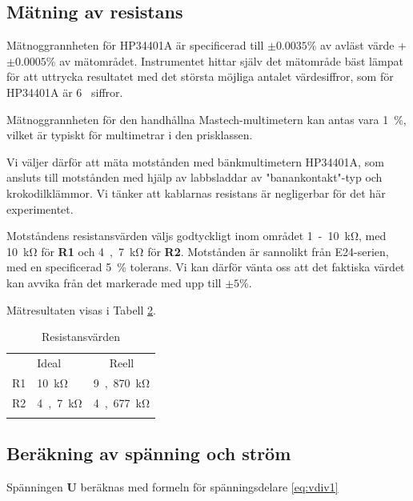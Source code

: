 \documentclass[11pt,a4paper]{article}
\begin{document}
\subsection{Mätning av resistans}\label{vdiv}
\par Mätnoggrannheten för HP34401A är specificerad till $\pm{}0.0035\%$ av
avläst värde + $\pm{}0.0005\%$ av mätområdet. Instrumentet hittar själv det
mätområde bäst lämpat för att uttrycka resultatet med det största möjliga antalet
värdesiffror, som för HP34401A är \si{6} siffror.
\par Mätnoggrannheten för den handhållna Mastech-multimetern kan antas vara
\si{1\%}, vilket är typiskt för multimetrar i den prisklassen.
\par Vi väljer därför att mäta motstånden med bänkmultimetern HP34401A, som ansluts
till motstånden med hjälp av labbsladdar av "banankontakt"-typ och krokodilklämmor.
Vi tänker att kablarnas resistans är negligerbar för det här experimentet.
\\
\par Motståndens resistansvärden väljs godtyckligt inom området \si{1-10\kohm}, 
med \si{10\kohm} för \textbf{R1} och \si{4,7\kohm} för \textbf{R2}.
Motstånden är sannolikt från E24-serien, med en specificerad \si{5\%} tolerans. Vi kan
därför vänta oss att det faktiska värdet kan avvika från det markerade med upp till
$\pm{}5\%$. 
\par Mätresultaten visas i Tabell \ref{restable}.

\begin{table}
    \begin{longtable}[c]{@{}llc@{}}
        \toprule\addlinespace
           & Ideal         & Reell
        \\\addlinespace
        \midrule\endhead
        R1 & \si{10\kohm}  & \si{9,870\kohm}
        \\\addlinespace
        R2 & \si{4,7\kohm} & \si{4,677\kohm}
        \\\addlinespace
        \bottomrule
        \addlinespace
        \caption{Resistansvärden}
        \label{restable}
    \end{longtable}
\end{table}


\subsection{Beräkning av spänning och ström}\label{vdiv_multi}
Spänningen \textbf{U} beräknas med formeln för spänningsdelare \eqref{eq:vdiv1}
\end{document}
